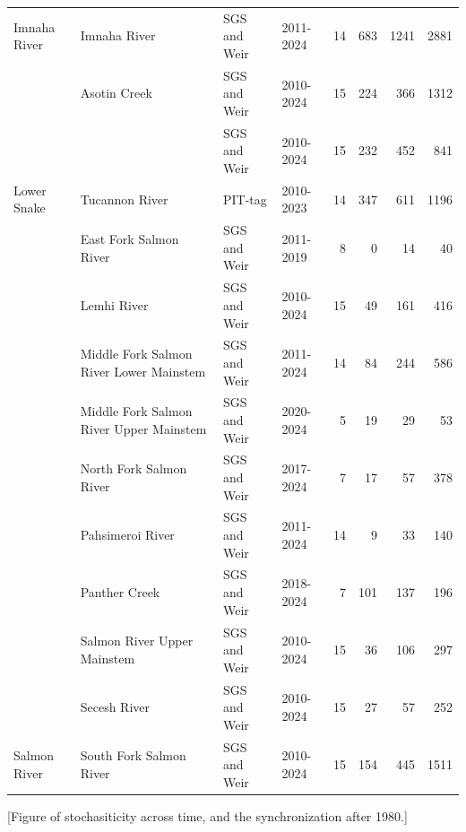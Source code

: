 \documentclass[10pt,a4paper]{article}
\begin{document}
\begin{table}
\begin{tabular}[t]{llllrrrr}
Imnaha River & Imnaha River & SGS and Weir & 2011-2024 & 14 & 683 & 1241 & 2881\\

 & Asotin Creek & SGS and Weir & 2010-2024 & 15 & 224 & 366 & 1312\\

 &  & SGS and Weir & 2010-2024 & 15 & 232 & 452 & 841\\

\multirow[t]{-3}{*}[1\dimexpr\aboverulesep+\belowrulesep+\cmidrulewidth]{\raggedright\arraybackslash Lower Snake} & \multirow[t]{-2}{*}{\raggedright\arraybackslash Tucannon River} & PIT-tag & 2010-2023 & 14 & 347 & 611 & 1196\\

 & East Fork Salmon River & SGS and Weir & 2011-2019 & 8 & 0 & 14 & 40\\

 & Lemhi River & SGS and Weir & 2010-2024 & 15 & 49 & 161 & 416\\

 & Middle Fork Salmon River Lower Mainstem & SGS and Weir & 2011-2024 & 14 & 84 & 244 & 586\\

 & Middle Fork Salmon River Upper Mainstem & SGS and Weir & 2020-2024 & 5 & 19 & 29 & 53\\

 & North Fork Salmon River & SGS and Weir & 2017-2024 & 7 & 17 & 57 & 378\\

 & Pahsimeroi River & SGS and Weir & 2011-2024 & 14 & 9 & 33 & 140\\

 & Panther Creek & SGS and Weir & 2018-2024 & 7 & 101 & 137 & 196\\

 & Salmon River Upper Mainstem & SGS and Weir & 2010-2024 & 15 & 36 & 106 & 297\\

 & Secesh River & SGS and Weir & 2010-2024 & 15 & 27 & 57 & 252\\

\multirow[t]{-10}{*}[9\dimexpr\aboverulesep+\belowrulesep+\cmidrulewidth]{\raggedright\arraybackslash Salmon River} & South Fork Salmon River & SGS and Weir & 2010-2024 & 15 & 154 & 445 & 1511\\
\bottomrule
\end{tabular}
\end{table}

{[}Figure of stochasiticity across time, and the synchronization after 1980.{]}
\end{document}

